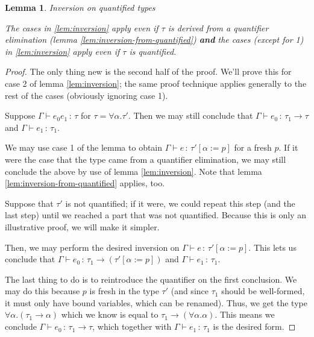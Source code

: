 \documentclass{article}
\newtheorem{lemma}{Lemma}
\newcommand{\hastp}[3]{#1 \vdash #2 \,:\, #3}
\begin{document}
\begin{lemma}{Inversion on quantified types} \label{lem:inversion-on-quantified}

  
  The cases in \ref{lem:inversion} apply even if \(\tau\) is derived from a
  quantifier elimination (lemma \ref{lem:inversion-from-quantified})
  \textbf{and} the cases (except for 1) in \ref{lem:inversion} apply even if
  \(\tau\) is quantified.
  
\end{lemma}

\begin{proof}
  The only thing new is the second half of the proof. We'll prove this for case
  2 of lemma \ref{lem:inversion}; the same proof technique applies generally to
  the rest of the cases (obviously ignoring case 1).

  Suppose \(\hastp \Gamma {e_0 e_1} \tau \) for \(\tau = \forall \alpha.
  \tau'\). Then we may still conclude that \(\hastp \Gamma {e_0} {\tau_1 \to
    \tau}\) and \(\hastp \Gamma {e_1} {\tau_1}\).

  We may use case 1 of the lemma to obtain \(\hastp \Gamma e {\tau'[\alpha :=
    p]}\) for a fresh \(p\). If it were the case that the type came from a
  quantifier elimination, we may still conclude the above by use of lemma
  \ref{lem:inversion}. Note that lemma \ref{lem:inversion-from-quantified}
  applies, too.
  
  Suppose that \(\tau'\) is not quantified; if it were, we could repeat this
  step (and the last step) until we reached a part that was not quantified.
  Because this is only an illustrative proof, we will make it simpler.

  Then, we may perform the desired inversion on \(\hastp \Gamma e {\tau'[\alpha
    := p]}\). This lets us conclude that \(\hastp \Gamma {e_0} {\tau_1 \to
    (\tau'[\alpha := p])}\) and \(\hastp \Gamma {e_1} {\tau_1}\).

  The last thing to do is to reintroduce the quantifier on the first conclusion.
  We may do this because \(p\) is fresh in the type \(\tau'\) (and since
  \(\tau_1\) should be well-formed, it must only have bound variables, which can
  be renamed). Thus, we get the type \(\forall \alpha. (\tau_1 \to \alpha)\) which
  we know is equal to \(\tau_1 \to (\forall \alpha. \alpha)\). This means we
  conclude \(\hastp \Gamma {e_0} {\tau_1 \to \tau}\), which together with
  \(\hastp \Gamma {e_1} {\tau_1}\) is the desired form.
\end{proof}
\end{document}
